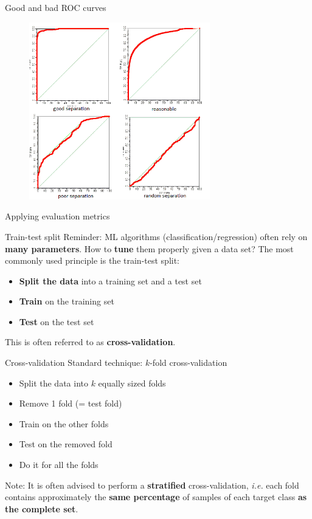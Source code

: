 \documentclass{beamer}
\newcommand{\1}[1]{\mathbbm{1}\left[#1\right]}
\begin{document}
\begin{frame}{Good and bad ROC curves}
\begin{figure}
\centering
\includegraphics[width=0.7\textwidth]{images/roc_quality.png}
\end{figure}
\end{frame}

\begin{frame}
\begin{center}
\Huge{Applying evaluation metrics}
\end{center}
\end{frame}

\begin{frame}{Train-test split}
Reminder: ML algorithms (classification/regression) often rely on \textbf{many parameters}. How to \textbf{tune} them properly given a data set?
\vfill
\pause
The most commonly used principle is the train-test split:
\begin{itemize}
	\item \textbf{Split the data} into a training set and a test set
	\item \textbf{Train} on the training set
	\item \textbf{Test} on the test set
\end{itemize}
\vfill
\pause
This is often referred to as \textbf{cross-validation}.
\end{frame}

\begin{frame}{Cross-validation}
Standard technique: $k$-fold cross-validation
\begin{itemize}
	\item Split the data into $k$ equally sized folds
	\item Remove 1 fold (= test fold)
	\item Train on the other folds
	\item Test on the removed fold
	\item Do it for all the folds
\end{itemize}
\vfill
\pause
Note: It is often advised to perform a \textbf{stratified} cross-validation, \textit{i.e.} each fold contains approximately the \textbf{same percentage} of samples of each target class \textbf{as the complete set}.
\end{frame}
\end{document}
